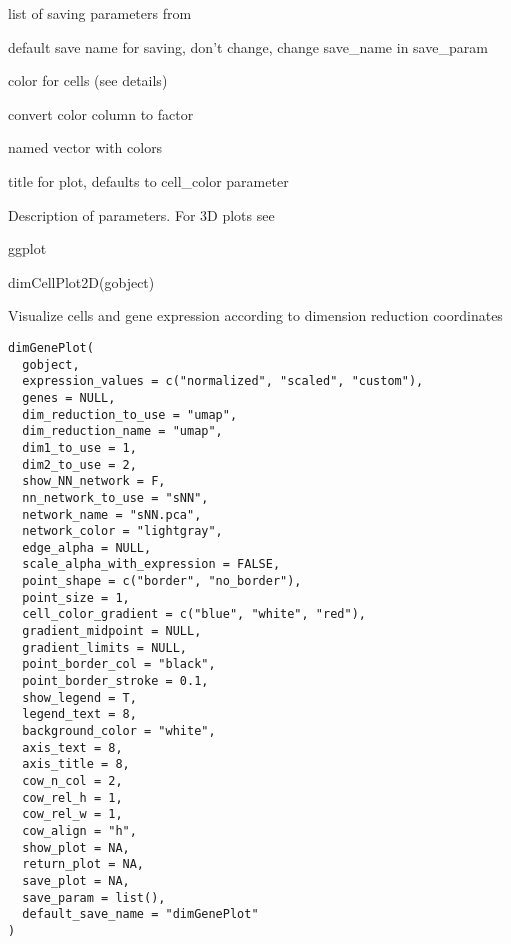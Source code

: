 \documentclass[a4paper]{book}
\begin{document}
\begin{Arguments}
\begin{ldescription}
\item[\code{save\_param}] list of saving parameters from 

\item[\code{default\_save\_name}] default save name for saving, don't change, change save\_name in save\_param

\item[\code{cell\_color}] color for cells (see details)

\item[\code{color\_as\_factor}] convert color column to factor

\item[\code{cell\_color\_code}] named vector with colors

\item[\code{title}] title for plot, defaults to cell\_color parameter
\end{ldescription}
\end{Arguments}
%
\begin{Details}\relax
Description of parameters. For 3D plots see 
\end{Details}
%
\begin{Value}
ggplot
\end{Value}
%
\begin{Examples}
\begin{ExampleCode}
    dimCellPlot2D(gobject)
\end{ExampleCode}
\end{Examples}
%
\begin{Description}\relax
Visualize cells and gene expression according to dimension reduction coordinates
\end{Description}
%
\begin{Usage}
\begin{verbatim}
dimGenePlot(
  gobject,
  expression_values = c("normalized", "scaled", "custom"),
  genes = NULL,
  dim_reduction_to_use = "umap",
  dim_reduction_name = "umap",
  dim1_to_use = 1,
  dim2_to_use = 2,
  show_NN_network = F,
  nn_network_to_use = "sNN",
  network_name = "sNN.pca",
  network_color = "lightgray",
  edge_alpha = NULL,
  scale_alpha_with_expression = FALSE,
  point_shape = c("border", "no_border"),
  point_size = 1,
  cell_color_gradient = c("blue", "white", "red"),
  gradient_midpoint = NULL,
  gradient_limits = NULL,
  point_border_col = "black",
  point_border_stroke = 0.1,
  show_legend = T,
  legend_text = 8,
  background_color = "white",
  axis_text = 8,
  axis_title = 8,
  cow_n_col = 2,
  cow_rel_h = 1,
  cow_rel_w = 1,
  cow_align = "h",
  show_plot = NA,
  return_plot = NA,
  save_plot = NA,
  save_param = list(),
  default_save_name = "dimGenePlot"
)
\end{verbatim}
\end{Usage}
\end{document}
